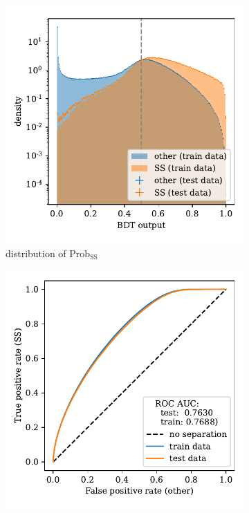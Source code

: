 \begin{figure}
    \centering
    \begin{subfigure}{0.5\textwidth}
        \centering
        \includegraphics[width=\textwidth]{images/SS_output.pdf}
        \caption{distribution of $\text{Prob}_\text{SS}$}
        \label{fig:SS_output}
    \end{subfigure}%
    \begin{subfigure}{0.5\textwidth}
        \centering
        \includegraphics[width=\textwidth]{images/SS_ROC.pdf}

\end{subfigure}
\end{figure}
